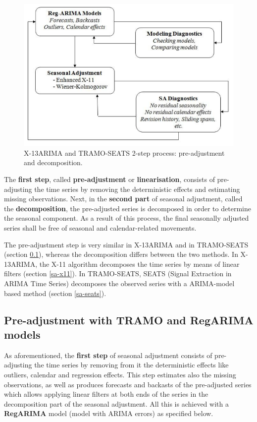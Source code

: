 \documentclass[article]{jss}
\begin{document}
\begin{figure}[htb]
\centering
\includegraphics[scale=0.8]{img/sa_2_steps.PNG} 
\caption{X-13ARIMA and TRAMO-SEATS 2-step process: pre-adjustment and decomposition.}
\label{fig:2_step_proc}
\end{figure}

The \textbf{first step}, called \textbf{pre-adjustment} or
\textbf{linearisation}, consists of pre-adjusting the time series by
removing the deterministic effects and estimating missing observations.
Next, in the \textbf{second part} of seasonal adjustment, called the
\textbf{decomposition}, the pre-adjusted series is decomposed in order
to determine the seasonal component. As a result of this process, the
final seasonally adjusted series shall be free of seasonal and
calendar-related movements.

The pre-adjustment step is very similar in X-13ARIMA and in TRAMO-SEATS
(section \ref{pre-adjustment}), whereas the decomposition differs
between the two methods. In X-13ARIMA, the X-11 algorithm decomposes the
time series by means of linear filters (section \ref{sa-x11}). In
TRAMO-SEATS, SEATS (Signal Extraction in ARIMA Time Series) decomposes
the observed series with a ARIMA-model based method (section
\ref{sa-seats}).

\hypertarget{pre-adjustment}{%
\subsection{Pre-adjustment with TRAMO and RegARIMA
models}\label{pre-adjustment}}

As aforementioned, the \textbf{first step} of seasonal adjustment
consists of pre-adjusting the time series by removing from it the
deterministic effects like outliers, calendar and regression effects.
This step estimates also the missing observations, as well as produces
forecasts and backasts of the pre-adjusted series which allows applying
linear filters at both ends of the series in the decomposition part of
the seasonal adjustment. All this is achieved with a \textbf{RegARIMA}
model (model with ARIMA errors) as specified below.
\end{document}
